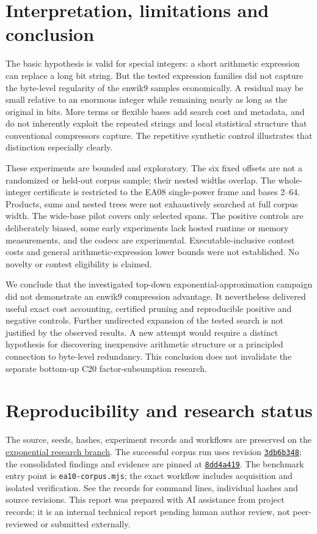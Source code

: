 \documentclass[11pt,a4paper]{article}
\begin{document}
\section{Interpretation, limitations and conclusion}
The basic hypothesis is valid for special integers: a short arithmetic expression can replace a long bit string. But the tested expression families did not capture the byte-level regularity of the enwik9 samples economically. A residual may be small relative to an enormous integer while remaining nearly as long as the original in bits. More terms or flexible bases add search cost and metadata, and do not inherently exploit the repeated strings and local statistical structure that conventional compressors capture. The repetitive synthetic control illustrates that distinction especially clearly.

These experiments are bounded and exploratory. The six fixed offsets are not a randomized or held-out corpus sample; their nested widths overlap. The whole-integer certificate is restricted to the EA08 single-power frame and bases 2--64. Products, sums and nested trees were not exhaustively searched at full corpus width. The wide-base pilot covers only selected spans. The positive controls are deliberately biased, some early experiments lack hosted runtime or memory measurements, and the codecs are experimental. Executable-inclusive contest costs and general arithmetic-expression lower bounds were not established. No novelty or contest eligibility is claimed.

We conclude that the investigated top-down exponential-approximation campaign did not demonstrate an enwik9 compression advantage. It nevertheless delivered useful exact cost accounting, certified pruning and reproducible positive and negative controls. Further undirected expansion of the tested search is not justified by the observed results. A new attempt would require a distinct hypothesis for discovering inexpensive arithmetic structure or a principled connection to byte-level redundancy. This conclusion does not invalidate the separate bottom-up C20 factor-subsumption research.

\section*{Reproducibility and research status}
The source, seeds, hashes, experiment records and workflows are preserved on the \href{https://github.com/sguzman/integrax/tree/research/exponential-approximation/research/exponential}{exponential research branch}. The successful corpus run uses revision \href{https://github.com/sguzman/integrax/commit/3db6b3483166c37557c03f645f3adef25de2708b}{\texttt{3db6b348}}; the consolidated findings and evidence are pinned at \href{https://github.com/sguzman/integrax/tree/8dd4a4196ae21664e843513c5437c248f3d8362b/research/exponential}{\texttt{8dd4a419}}. The benchmark entry point is \texttt{ea10-corpus.mjs}; the exact workflow includes acquisition and isolated verification. See the records for command lines, individual hashes and source revisions. This report was prepared with AI assistance from project records; it is an internal technical report pending human author review, not peer-reviewed or submitted externally.
\end{document}

